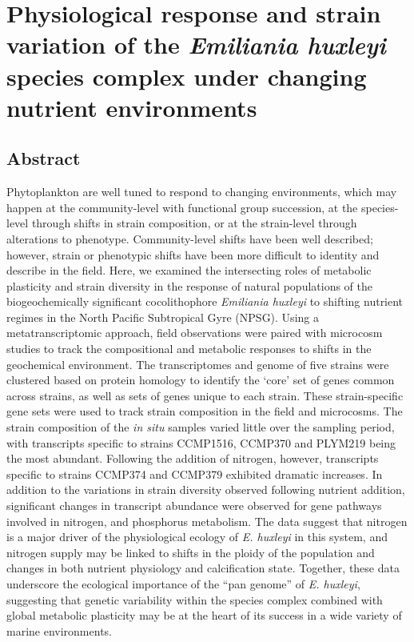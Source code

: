 

\chapter{Physiological response and strain variation of the \textsl{Emiliania huxleyi} species complex under changing nutrient environments}

\raggedbottom


\clearpage

\section{Abstract} 
Phytoplankton are well tuned to respond to changing environments, which may happen at the community-level with functional group succession, at the species-level through shifts in strain composition, or at the strain-level through alterations to phenotype. Community-level shifts have been well described; however, strain or phenotypic shifts have been more difficult to identity and describe in the field. Here, we examined the intersecting roles of metabolic plasticity and strain diversity in the response of natural populations of the biogeochemically significant cocolithophore \textit{Emiliania huxleyi} to shifting nutrient regimes in the North Pacific Subtropical Gyre (NPSG). Using a metatranscriptomic approach, field observations were paired with microcosm studies to track the compositional and metabolic responses to shifts in the geochemical environment. The transcriptomes and genome of five strains were clustered based on protein homology to identify the `core' set of genes common across strains, as well as sets of genes unique to each strain. These strain-specific gene sets were used to track strain composition in the field and microcosms. The strain composition of the \textit{in situ} samples varied little over the sampling period, with transcripts specific to strains CCMP1516, CCMP370 and PLYM219 being the most abundant.  Following the addition of nitrogen, however, transcripts specific to strains CCMP374 and CCMP379 exhibited dramatic increases. In addition to the variations in strain diversity observed following nutrient addition, significant changes in transcript abundance were observed for gene pathways involved in nitrogen, and phosphorus metabolism.  The data suggest that nitrogen is a major driver of the physiological ecology of \textit{E. huxleyi} in this system, and nitrogen supply may be linked to shifts in the ploidy of the population and changes in both nutrient physiology and calcification state. Together, these data underscore the ecological importance of the ``pan genome'' of \textit{E. huxleyi}, suggesting that genetic variability within the species complex combined with global metabolic plasticity may be at the heart of its success in a wide variety of marine environments. \par

